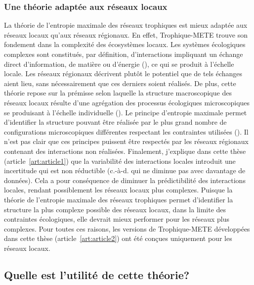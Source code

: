 \subsubsection{Une théorie adaptée aux réseaux locaux} 

La théorie de l'entropie maximale des réseaux trophiques est mieux adaptée aux
réseaux locaux qu'aux réseaux régionaux. En effet, Trophique-METE trouve son
fondement dans la complexité des écosystèmes locaux. Les systèmes écologiques
complexes sont constitués, par définition, d'interactions impliquant un échange
direct d'information, de matière ou d'énergie (\cite{Ladyman2013What}), ce qui
se produit à l'échelle locale. Les réseaux régionaux décrivent plutôt le
potentiel que de tels échanges aient lieu, sans nécessairement que ces derniers
soient réalisés. De plus, cette théorie repose sur la prémisse selon laquelle la
structure macroscopique des réseaux locaux résulte d'une agrégation des
processus écologiques microscopiques se produisant à l'échelle individuelle
(\cite{Frank2009Common}). Le principe d'entropie maximale permet d'identifier la
structure pouvant être réalisée par le plus grand nombre de configurations
microscopiques différentes respectant les contraintes utilisées
(\cite{Dewar2008Statistical}). Il n'est pas clair que ces principes puissent
être respectés par les réseaux régionaux contenant des interactions non
réalisées. Finalement, j'explique dans cette thèse (article~\ref{art:article1})
que la variabilité des interactions locales introduit une incertitude qui est
non réductible (c.-à-d. qui ne diminue pas avec davantage de données). Cela a
pour conséquence de diminuer la prédictibilité des interactions locales, rendant
possiblement les réseaux locaux plus complexes. Puisque la théorie de l'entropie
maximale des réseaux trophiques permet d'identifier la structure la plus
complexe possible des réseaux locaux, dans la limite des contraintes
écologiques, elle devrait mieux performer pour les réseaux plus complexes. Pour
toutes ces raisons, les versions de Trophique-METE développées dans cette thèse
(article~\ref{art:article2}) ont été conçues uniquement pour les réseaux locaux. 

\subsection{Quelle est l'utilité de cette théorie?} 

